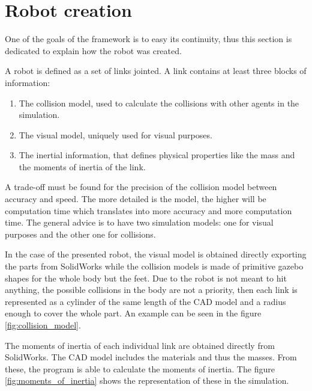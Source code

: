 \section{Robot creation} %
\label{sec:robot_creation}
One of the goals of the framework is to easy its continuity, thus this section is dedicated to explain how the robot was created.

A robot is defined as a set of links jointed.
A link contains at least three blocks of information:
\begin{enumerate}
   \item The collision model, used to calculate the collisions with other agents in the simulation.
   \item The visual model, uniquely used for visual purposes.
   \item The inertial information, that defines physical properties like the mass and the moments of inertia of the link.
\end{enumerate} 

A trade-off must be found for the precision of the collision model between accuracy and speed.
The more detailed is the model, the higher will be computation time which translates into more accuracy and more computation time.
The general advice is to have two simulation models: one for visual purposes and the other one for collisions.

In the case of the presented robot, the visual model is obtained directly exporting the parts from SolidWorks while the collision models is made of primitive gazebo shapes for the whole body but the feet.
Due to the robot is not meant to hit anything, the possible collisions in the body are not a priority, then each link is represented as a cylinder of the same length of the CAD model and a radius enough to cover the whole part.
An example can be seen in the figure \ref{fig:collision_model}.

The moments of inertia of each individual link are obtained directly from SolidWorks.
The CAD model includes the materials and thus the masses.
From these, the program is able to calculate the moments of inertia.
The figure \ref{fig:moments_of_inertia} shows the representation of these in the simulation.


